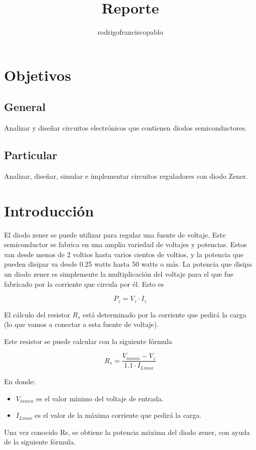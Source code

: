 \documentclass{mylib/reporteConCalif}
\title{Reporte}
\author{rodrigofranciscopablo }
\begin{document}
\coverPage


\section{Objetivos}

\subsection{General}

Analizar y diseñar circuitos electrónicos que contienen diodos semiconductores.

\subsection{Particular}

Analizar, diseñar, simular e implementar circuitos reguladores con diodo Zener.

\section{Introducción}

El diodo zener se puede utilizar para regular una fuente de voltaje. Este semiconductor se fabrica en una amplia variedad de voltajes y potencias.
Estos van desde menos de 2 voltios hasta varios cientos de voltios, y la potencia que pueden disipar va desde 0.25 watts hasta 50 watts o más.
La potencia que disipa un diodo zener es simplemente la multiplicación del voltaje para el que fue fabricado por la corriente que circula por él. Esto es

$$ P_z = V_z \cdot I_z$$

El cálculo del resistor $R_s$ está determinado por la corriente que pedirá la carga (lo que vamos a conectar a esta fuente de voltaje).

Este resistor se puede calcular con la siguiente fórmula

$$R_s = \frac{V_{in min}- V_z}{1.1 \cdot I_{L max}}$$

En donde:
\begin{itemize}
	\item $V_{in min}$ es el valor mínimo del voltaje de entrada.
	\item $I_{L max}$ es el valor de la máxima corriente que pedirá la carga.
\end{itemize}

Una vez conocido Rs, se obtiene la potencia máxima del diodo zener, con ayuda de la siguiente fórmula.
\end{document}
